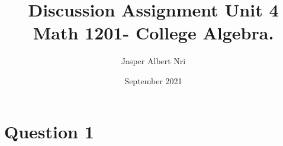 \documentclass{article}
\title{Discussion Assignment Unit 4\\
Math 1201- College Algebra.
}
\author{Jasper Albert Nri}
\date{September 2021}
\begin{document}
\maketitle

\section*{Question 1}
\end{document}
